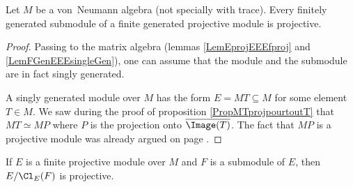 \begin{proposition}
Let $M$ be a von~Neumann algebra (not specially with trace). Every finitely generated submodule of a finite generated projective module is projective.
\end{proposition}

\begin{proof}
Passing to the matrix algebra (lemmas \ref{LemEprojEEEfproj} and \ref{LemFGenEEEsingleGen}), one can assume that the module and the submodule are in fact singly generated.

A singly generated module over $ M$ has the form $E=MT\subseteq M$ for some element $T\in M$. We saw during the proof of proposition \ref{PropMTprojpourtoutT} that $MT\simeq MP$ where $P$ is the projection onto $\overline{ \Image(T) }$. The fact that $MP$ is a projective module was already argued on page \pageref{PgMPprojModule}.
\end{proof}

\begin{proposition}			\label{PropEfgpFssmodQuotProj}
If $E$ is a finite projective module over $M$ and $F$ is a submodule of $E$, then $E/\Cl_E(F)$ is projective.
\end{proposition}

